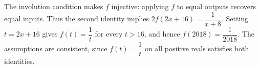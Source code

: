 The involution condition makes $f$ injective: applying $f$ to equal outputs recovers equal inputs. Thus the second identity implies $2f(2x+16)=\dfrac{1}{x+8}$. Setting $t=2x+16$ gives $f(t)=\dfrac{1}{t}$ for every $t>16$, and hence $f(2018)=\boxed{\dfrac{1}{2018}}$. The assumptions are consistent, since $f(t)=\dfrac{1}{t}$ on all positive reals satisfies both identities.
